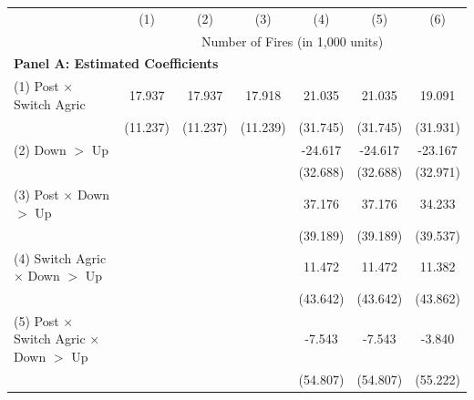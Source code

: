 {
\def\sym#1{\ifmmode^{#1}\else\(^{#1}\)\fi}
\begin{tabular}{l*{6}{c}}
\hline
            &\multicolumn{1}{c}{(1)}         &\multicolumn{1}{c}{(2)}         &\multicolumn{1}{c}{(3)}         &\multicolumn{1}{c}{(4)}         &\multicolumn{1}{c}{(5)}         &\multicolumn{1}{c}{(6)}         \\
            & \multicolumn{6}{c}{Number of Fires (in 1,000 units)} \\ \hline
\multicolumn{7}{l}{\textbf{Panel A: Estimated Coefficients}} \\ \hline
(1) Post $\times$ Switch Agric&      17.937         &      17.937         &      17.918         &      21.035         &      21.035         &      19.091         \\
            &    (11.237)         &    (11.237)         &    (11.239)         &    (31.745)         &    (31.745)         &    (31.931)         \\
(2) Down $>$ Up&                     &                     &                     &     -24.617         &     -24.617         &     -23.167         \\
            &                     &                     &                     &    (32.688)         &    (32.688)         &    (32.971)         \\
(3) Post $\times$ Down $>$ Up&                     &                     &                     &      37.176         &      37.176         &      34.233         \\
            &                     &                     &                     &    (39.189)         &    (39.189)         &    (39.537)         \\
(4) Switch Agric  $\times$ Down $>$ Up&                     &                     &                     &      11.472         &      11.472         &      11.382         \\
            &                     &                     &                     &    (43.642)         &    (43.642)         &    (43.862)         \\
(5) Post $\times$ Switch Agric  $\times$ Down $>$ Up&                     &                     &                     &      -7.543         &      -7.543         &      -3.840         \\
            &                     &                     &                     &    (54.807)         &    (54.807)         &    (55.222)         \\





\end{tabular}}
